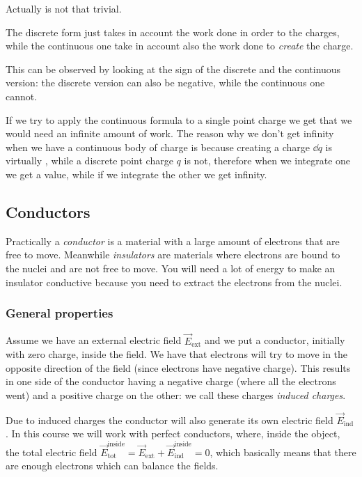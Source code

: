 \documentclass[12pt]{extarticle}
\begin{document}
\begin{remark}{}{}
    Actually  is not that trivial.

    The discrete form just takes in account the work done in order to  the charges, while the continuous one take in account also the work done to \emph{create} the charge.

    This can be observed by looking at the sign of the discrete and the continuous version: the discrete version can also be negative, while the continuous one cannot.
\end{remark}

If we try to apply the continuous formula to a single point charge we get that we would need an infinite amount of work.
The reason why we don't get infinity when we have a continuous body of charge is because creating a charge $\dd{q}$ is virtually , while a discrete point charge $q$ is not, therefore when we integrate one we get a value, while if we integrate the other we get infinity.

\subsection{Conductors}

Practically a \emph{conductor} is a material with a large amount of electrons that are free to move.
Meanwhile \emph{insulators} are materials where electrons are bound to the nuclei and are not free to move. You will need a lot of energy to make an insulator conductive because you need to extract the electrons from the nuclei.

\subsubsection{General properties}

Assume we have an external electric field $\vec E_\text{ext}$ and we put a conductor, initially with zero charge, inside the field.
We have that electrons will try to move in the opposite direction of the field (since electrons have negative charge).
This results in one side of the conductor having a negative charge (where all the electrons went) and a positive charge on the other: we call these charges \emph{induced charges}.

Due to induced charges the conductor will also generate its own electric field $\vec E_\text{ind}$.
In this course we will work with perfect conductors, where, inside the object, the total electric field $\vec E_\text{tot}^\text{inside} = \vec E_\text{ext} + \vec E_\text{ind}^\text{inside} = 0$, which basically means that there are enough electrons which can balance the fields.
\end{document}
